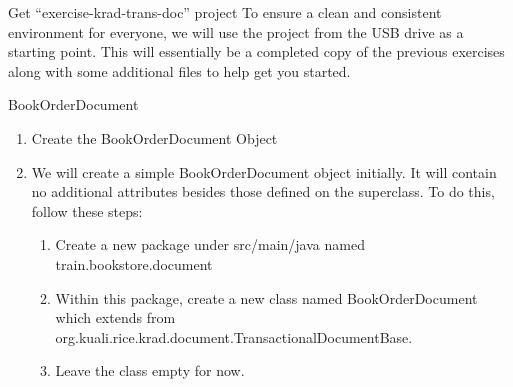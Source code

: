 \documentclass[xcolor=dvipsnames,14pt,professionalfonts]{beamer}
\begin{document}
\begin{frame}{Get “exercise-krad-trans-doc” project}
To ensure a clean and consistent environment for everyone, we will use
the project from the USB drive as a starting point. This will
essentially be a completed copy of the previous exercises along with
some additional files to help get you started.
\end{frame}
\begin{frame}{BookOrderDocument}
\begin{enumerate}
  \item Create the BookOrderDocument Object
  \item We will create a simple BookOrderDocument object initially.  It will contain no additional attributes besides those defined on the superclass.  To do this, follow these steps:
    \begin{enumerate}
    \item Create a new package under src/main/java named train.bookstore.document
    \item Within this package, create a new class named BookOrderDocument which extends from org.kuali.rice.krad.document.TransactionalDocumentBase.
    \item Leave the class empty for now.
    \end{enumerate}
   \end{enumerate}
\end{frame}
\end{document}
